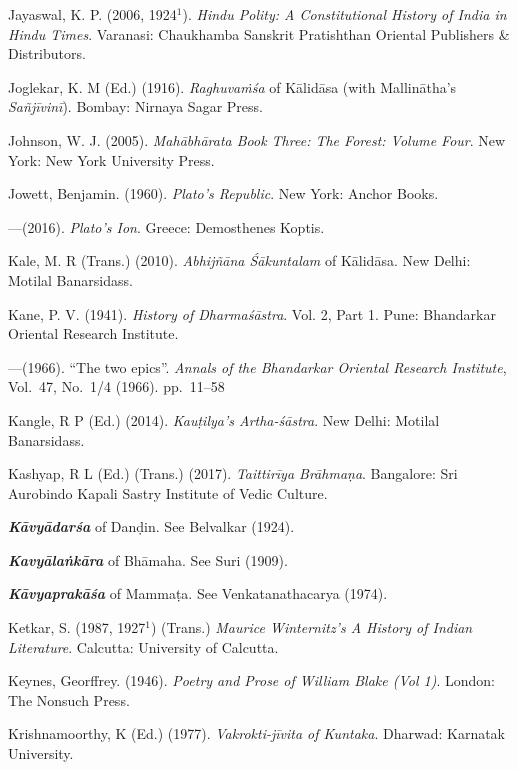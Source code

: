 \begin{thebibliography}{99}
Jayaswal, K. P. (2006, 1924$^{1}$). {\sl Hindu Polity: A Constitutional History of India in Hindu Times}. Varanasi: Chaukhamba Sanskrit Pratishthan Oriental Publishers \& Distributors. 

Joglekar, K. M (Ed.) (1916). {\sl Raghuvaṁśa} of Kālidāsa (with Mallinātha’s {\sl Sañjīvinī}). Bombay: Nirnaya Sagar Press.  

Johnson, W. J. (2005). {\sl Mahābhārata Book Three: The Forest: Volume Four}. New York: New York University Press. 

Jowett, Benjamin. (1960). {\sl Plato’s Republic}. New York: Anchor Books. 

---\kern3pt(2016). {\sl Plato’s Ion}. Greece: Demosthenes Koptis. 

Kale, M. R (Trans.) (2010). {\sl Abhijñāna Śākuntalam} of Kālidāsa. New Delhi: Motilal Banarsidass. 

Kane, P. V. (1941). {\sl History of Dharmaśāstra}. Vol. 2, Part 1. Pune: Bhandarkar Oriental Research Institute. 

---\kern3pt(1966). “The two epics”. {\sl Annals of the Bhandarkar Oriental Research Institute}, Vol.~47, No.~1/4 (1966). pp.~11--58 

Kangle, R P (Ed.) (2014). {\sl Kauṭilya’s Artha-śāstra}. New Delhi: Motilal Banarsidass. 

Kashyap, R L (Ed.) (Trans.) (2017). {\sl Taittirīya Brāhmaṇa}. Bangalore: Sri Aurobindo Kapali Sastry Institute of Vedic Culture. 

{\sl\bfseries Kāvyādarśa} of Danḍin. See Belvalkar (1924).  

{\sl\bfseries Kavyālaṅkāra} of Bhāmaha. See Suri (1909).

{\sl\bfseries Kāvyaprakāśa} of Mammaṭa. See Venkatanathacarya (1974).

Ketkar, S. (1987, 1927$^{1}$) (Trans.) {\sl Maurice Winternitz’s A History of Indian Literature}. Calcutta: University of Calcutta. 

Keynes, Georffrey. (1946). {\sl Poetry and Prose of William Blake (Vol 1)}. London: The Nonsuch Press. 

Krishnamoorthy, K (Ed.) (1977). {\sl Vakrokti-jīvita of Kuntaka}. Dharwad: Karnatak University. 


\end{thebibliography}
